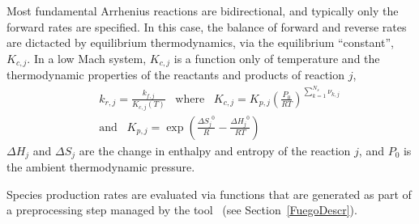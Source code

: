 Most fundamental Arrhenius reactions are bidirectional, and typically only the forward rates are specified. In this case, the balance of forward and reverse rates are dictacted by equilibrium thermodynamics, via the equilibrium ``constant'', $K_{c,j}$.  In a low Mach system, $K_{c,j}$ is a function only of temperature and the thermodynamic properties of the reactants and products of reaction $j$,
\begin{eqnarray*}
&&k_{r,j} = \frac{k_{f,j}}{K_{c,j}(T)} \;\;\; \mbox{where} \;\;\; K_{c,j}=K_{p,j} \left( \frac{P_{0}}{RT} \right)^{\sum_{k=1}^{N_s} \nu_{k,j}}
\\
&&\mbox{and} \;\;\; K_{p,j}=\exp \left( \frac{\Delta {S_j}^{0}}{R} - \frac{\Delta {H_j}^{0}}{RT} \right)
\end{eqnarray*}
$\Delta H_j$ and $\Delta S_j$ are the change in enthalpy and entropy of the reaction $j$, and $P_0$ is the ambient thermodynamic pressure.

Species production rates are evaluated via functions that are generated as part of a preprocessing step managed by the tool \fuego\ (see Section~\ref{FuegoDescr}).

